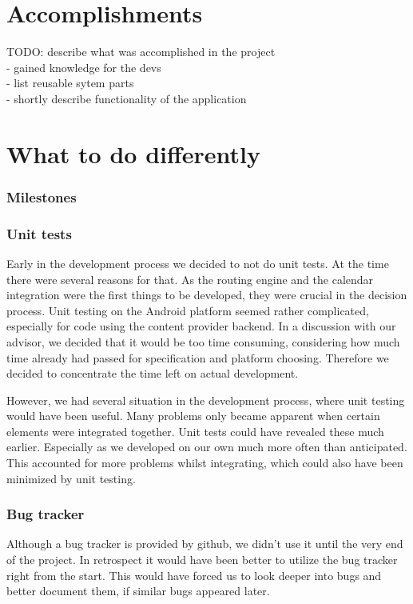 \section{Accomplishments}
TODO: describe what was accomplished in the project\\
- gained knowledge for the devs\\
- list reusable sytem parts\\
- shortly describe functionality of the application\\
\section{What to do differently} %
\label{sec:Whattododifferently}
\subsubsection{Milestones} %
\label{ssub:Milestones}

\subsubsection{Unit tests} %
\label{ssub:Unittests}
Early in the development process we decided to not do unit tests.
At the time there were several reasons for that.
As the routing engine and the calendar integration were the first
things to be developed, they were crucial in the decision process.
Unit testing on the Android platform seemed rather complicated,
especially for code using the content provider backend. In a discussion
with our advisor, we decided that it would be too time consuming,
considering how much time already had passed for specification and
platform choosing. Therefore we decided to concentrate the time left
on actual development.

However, we had several situation in the development process, where
unit testing would have been useful. Many problems only became
apparent when certain elements were integrated together. Unit tests
could have revealed these much earlier. Especially as we developed
on our own much more often than anticipated. This accounted for more
problems whilst integrating, which could also have been minimized by
unit testing.


\subsubsection{Bug tracker} %
\label{ssub:Bugtracker}
Although a bug tracker is provided by github, we didn't use it
until the very end of the project. In retrospect it would have been
better to utilize the bug tracker right from the start. This would
have forced us to look deeper into bugs and better document them, if
similar bugs appeared later.

